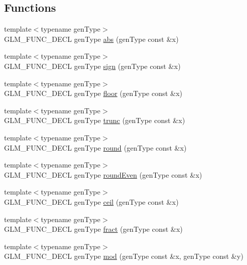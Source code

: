 \subsection*{Functions}
\begin{CompactItemize}
\item 
{\footnotesize template$<$typename genType$>$ }\\GLM\_\-FUNC\_\-DECL genType \hyperlink{group__core__func__common_gab4b95b47f2918ce6e7ac279a0ba27c1}{abs} (genType const \&x)
\item 
{\footnotesize template$<$typename genType$>$ }\\GLM\_\-FUNC\_\-DECL genType \hyperlink{group__core__func__common_g74ce53889485c33ac9d81d2b27165c80}{sign} (genType const \&x)
\item 
{\footnotesize template$<$typename genType$>$ }\\GLM\_\-FUNC\_\-DECL genType \hyperlink{group__core__func__common_gf87c2d5cbed8b293dcb7506b7c06c9e1}{floor} (genType const \&x)
\item 
{\footnotesize template$<$typename genType$>$ }\\GLM\_\-FUNC\_\-DECL genType \hyperlink{group__core__func__common_g30f4c901cd3ebdd26e8f0a73f15c1e89}{trunc} (genType const \&x)
\item 
{\footnotesize template$<$typename genType$>$ }\\GLM\_\-FUNC\_\-DECL genType \hyperlink{group__core__func__common_g931fae510be1b98fe22646fc649a50d2}{round} (genType const \&x)
\item 
{\footnotesize template$<$typename genType$>$ }\\GLM\_\-FUNC\_\-DECL genType \hyperlink{group__core__func__common_ge07e5945cc0443ab91a28da0aa2ba864}{roundEven} (genType const \&x)
\item 
{\footnotesize template$<$typename genType$>$ }\\GLM\_\-FUNC\_\-DECL genType \hyperlink{group__core__func__common_g18be34b68c7f647b4455bafe4c7d7ecd}{ceil} (genType const \&x)
\item 
{\footnotesize template$<$typename genType$>$ }\\GLM\_\-FUNC\_\-DECL genType \hyperlink{group__core__func__common_g7418318e0c1a82f21805628aabb0e24e}{fract} (genType const \&x)
\item 
{\footnotesize template$<$typename genType$>$ }\\GLM\_\-FUNC\_\-DECL genType \hyperlink{group__core__func__common_gffb813e4651fc91dbb906e46bff8ea8a}{mod} (genType const \&x, genType const \&y)

\end{CompactItemize}
